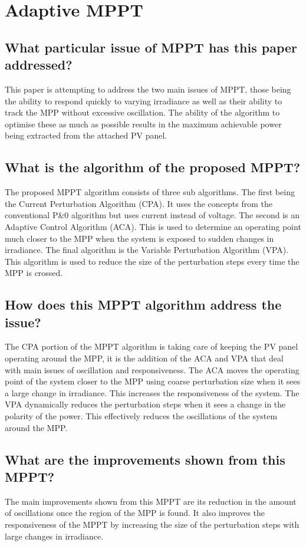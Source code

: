 \documentclass{article}
\begin{document}
	
	\section{Adaptive MPPT}
		\subsection{What particular issue of MPPT has this paper \cite{6732969} addressed?}
			This paper is attempting to address the two main issues of MPPT, those being the ability to respond quickly to varying irradiance as well as their ability to track the MPP without excessive oscillation. The ability of the algorithm to optimise these as much as possible results in the maximum achievable power being extracted from the attached PV panel.
		\subsection{What is the algorithm of the proposed MPPT?}
			The proposed MPPT algorithm consists of three sub algorithms. The first being the Current Perturbation Algorithm (CPA). It uses the concepts from the conventional P\&0 algorithm but uses current instead of voltage. The second is an Adaptive Control Algorithm (ACA). This is used to determine an operating point much closer to the MPP when the system is exposed to sudden changes in irradiance. The final algorithm is the Variable Perturbation Algorithm (VPA). This algorithm is used to reduce the size of the perturbation steps every time the MPP is crossed.
		\subsection{How does this MPPT algorithm address the issue?}
			The CPA portion of the MPPT algorithm is taking care of keeping the PV panel operating around the MPP, it is the addition of the ACA and VPA that deal with main issues of oscillation and responsiveness. The ACA moves the operating point of the system closer to the MPP using coarse perturbation size when it sees a large change in irradiance. This increases the responsiveness of the system. The VPA dynamically reduces the perturbation steps when it sees a change in the polarity of the power. This effectively reduces the oscillations of the system around the MPP.
		\subsection{What are the improvements shown from this MPPT?}
			The main improvements shown from this MPPT are its reduction in the amount of oscillations once the region of the MPP is found. It also improves the responsiveness of the MPPT by increasing the size of the perturbation steps with large changes in irradiance.
\end{document}
